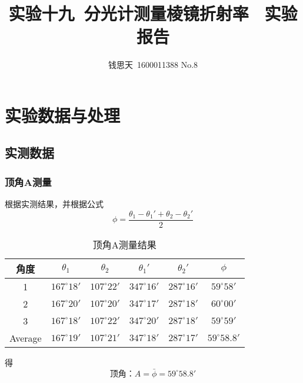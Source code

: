 \documentclass{ctexart}
\author{钱思天\ 1600011388 No.8}
\title{实验十九\ 分光计测量棱镜折射率 \ 实验报告}
\begin{document}
      \maketitle
      \section{实验数据与处理}
      \subsection{实测数据}
      \subsubsection{顶角A测量}
      根据实测结果，并根据公式$$\phi=\frac{\theta_1-\theta_1'+\theta_2-\theta_2'}{2}$$
\begin{table}[H]
    \centering
    \caption{顶角A测量结果}
      \begin{tabular}{|c|c|c|c|c|c|}
        \hline
      角度    & {$\theta_1$} & {$\theta_2$} & {$\theta_1'$} & {$\theta_2'$} & {$\phi$} \\
      \hline
      {1} & $167^\circ 18'$ & $107^\circ 22'$ & $347^\circ 16'$ & $287^\circ 16'$ & $59^\circ 58'$ \\
      \hline
      {2} & $167^\circ 20'$ & $107^\circ 20'$ & $347^\circ 17'$ & $287^\circ 18'$ & $60^\circ 00'$ \\
      \hline
      {3} & $167^\circ 18'$ & $107^\circ 22'$ & $347^\circ 20'$ & $287^\circ 18'$ & $59^\circ 59'$ \\
      \hline
      Average & $167^\circ 19'$ & $107^\circ 21'$ & $347^\circ 18'$ & $287^\circ 17'$ & $59^\circ 58.8'$ \\
      \hline
      \end{tabular}%
    \label{tab:addlabel}%
  \end{table}%
  得$$\mbox{顶角：}A=\bar{\phi}=59^\circ 58.8'$$
\end{document}

